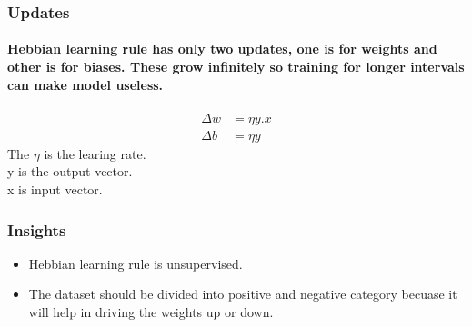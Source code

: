 \documentclass[../main.tex]{subfiles}
\begin{document}
\subsubsection{Updates}
\paragraph{Hebbian learning rule has only two updates, one is for weights and other is for biases. These grow infinitely so training for longer intervals can make model useless.}
\begin{align}
  \Delta w &= \eta y.x \\
  \Delta b &= \eta y
\end{align}
The $\eta$ is the learing rate. \\
y is the output vector. \\
x is input vector.
\subsubsection{Insights}
\begin{itemize}
  \item Hebbian learning rule is unsupervised.
  \item The dataset should be divided into positive and negative category becuase it will help in driving the weights up or down.
\end{itemize}
\end{document}
